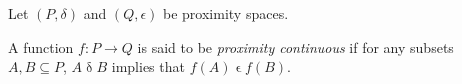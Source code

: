 \documentclass[12pt]{article}
\begin{document}
Let $(P,\delta)$ and $(Q,\epsilon)$ be proximity spaces.

A function $f: P\to Q$ is said to be \emph{proximity continuous} if for any subsets $A,B\subseteq P$, $A\mathrel{\delta}B$ implies that $f(A)\mathrel{\epsilon}f(B)$.
\end{document}
